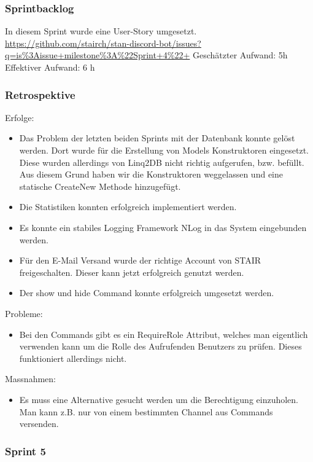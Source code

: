 \documentclass[a4paper, table]{article}
\begin{document}
\subsubsection*{Sprintbacklog}
In diesem Sprint wurde eine User-Story umgesetzt.\\
\url{https://github.com/stairch/stan-discord-bot/issues?q=is%3Aissue+milestone%3A%22Sprint+4%22+}
\newline
Geschätzter Aufwand: 5h
\newline
Effektiver Aufwand: 6 h

\subsubsection*{Retrospektive}
Erfolge:
\begin{itemize}
    \item Das Problem der letzten beiden Sprints mit der Datenbank konnte gelöst werden.
    Dort wurde für die Erstellung von Models Konstruktoren eingesetzt.
    Diese wurden allerdings von Linq2DB nicht richtig aufgerufen, bzw. befüllt.
    Aus diesem Grund haben wir die Konstruktoren weggelassen und eine statische CreateNew Methode hinzugefügt.
    \item Die Statistiken konnten erfolgreich implementiert werden.
    \item Es konnte ein stabiles Logging Framework NLog in das System eingebunden werden.
    \item Für den E-Mail Versand wurde der richtige Account von STAIR freigeschalten.
    Dieser kann jetzt erfolgreich genutzt werden.
    \item Der show und hide Command konnte erfolgreich umgesetzt werden.
\end{itemize}
Probleme:
\begin{itemize}
    \item Bei den Commands gibt es ein RequireRole Attribut, welches man eigentlich verwenden kann um die Rolle des Aufrufenden Benutzers zu prüfen.
    Dieses funktioniert allerdings nicht.
\end{itemize}
Massnahmen:
\begin{itemize}
    \item Es muss eine Alternative gesucht werden um die Berechtigung einzuholen.
    Man kann z.B. nur von einem bestimmten Channel aus Commands versenden.
\end{itemize}

\newpage
\subsubsection{Sprint 5}
\end{document}
